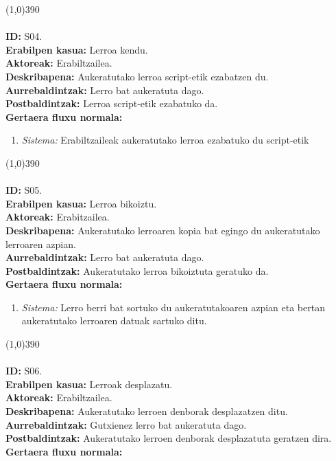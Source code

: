 \line(1,0){390}\\
\noindent\\
\textbf{ID:} S04.\\
\textbf{Erabilpen kasua:} Lerroa kendu.\\
\textbf{Aktoreak:} Erabiltzailea.\\
\textbf{Deskribapena:} Aukeratutako lerroa script-etik ezabatzen du.\\
\textbf{Aurrebaldintzak:} Lerro bat aukeratuta dago.\\
\textbf{Postbaldintzak:} Lerroa script-etik ezabatuko da.\\
\textbf{Gertaera fluxu normala:}
\begin{enumerate}
	\item \textit{Sistema:} Erabiltzaileak aukeratutako lerroa ezabatuko du script-etik
\end{enumerate}
\line(1,0){390}\\
\noindent\\
\textbf{ID:} S05.\\
\textbf{Erabilpen kasua:} Lerroa bikoiztu.\\
\textbf{Aktoreak:} Erabitzailea.\\
\textbf{Deskribapena:} Aukeratutako lerroaren kopia bat egingo du aukeratutako lerroaren azpian.\\
\textbf{Aurrebaldintzak:} Lerro bat aukeratuta dago.\\
\textbf{Postbaldintzak:} Aukeratutako lerroa bikoiztuta geratuko da.\\
\textbf{Gertaera fluxu normala:}
\begin{enumerate}
	\item \textit{Sistema:} Lerro berri bat sortuko du aukeratutakoaren azpian eta bertan aukeratutako lerroaren datuak sartuko ditu.
\end{enumerate}
\line(1,0){390}\\
\noindent\\
\textbf{ID:} S06.\\
\textbf{Erabilpen kasua:} Lerroak desplazatu.\\
\textbf{Aktoreak:} Erabiltzailea.\\
\textbf{Deskribapena:} Aukeratutako lerroen denborak desplazatzen ditu.\\
\textbf{Aurrebaldintzak:} Gutxienez lerro bat aukeratuta dago.\\
\textbf{Postbaldintzak:} Aukeratutako lerroen denborak desplazatuta geratzen dira.\\
\textbf{Gertaera fluxu normala:}
